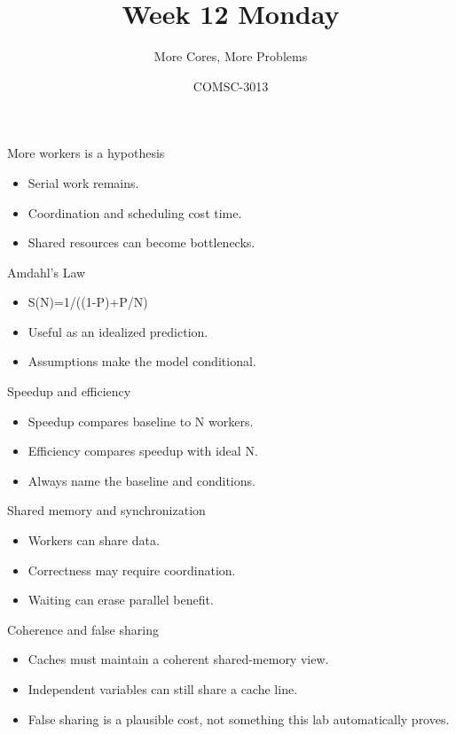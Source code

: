 \documentclass{beamer}
\title{Week 12 Monday}\subtitle{More Cores, More Problems}\author{COMSC-3013}\date{}
\begin{document}
\begin{frame}\titlepage\end{frame}
\begin{frame}{More workers is a hypothesis}\begin{itemize}\item Serial work remains.\item Coordination and scheduling cost time.\item Shared resources can become bottlenecks.\end{itemize}\end{frame}
\begin{frame}{Amdahl's Law}\begin{itemize}\item S(N)=1/((1-P)+P/N)\item Useful as an idealized prediction.\item Assumptions make the model conditional.\end{itemize}\end{frame}
\begin{frame}{Speedup and efficiency}\begin{itemize}\item Speedup compares baseline to N workers.\item Efficiency compares speedup with ideal N.\item Always name the baseline and conditions.\end{itemize}\end{frame}
\begin{frame}{Shared memory and synchronization}\begin{itemize}\item Workers can share data.\item Correctness may require coordination.\item Waiting can erase parallel benefit.\end{itemize}\end{frame}
\begin{frame}{Coherence and false sharing}\begin{itemize}\item Caches must maintain a coherent shared-memory view.\item Independent variables can still share a cache line.\item False sharing is a plausible cost, not something this lab automatically proves.\end{itemize}\end{frame}
\end{document}
